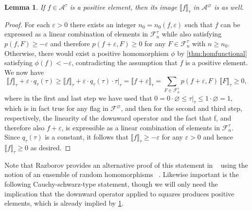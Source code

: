 \documentclass[a4paper,11pt]{article}
\newtheorem{lemma}[theorem]{Lemma}
\numberwithin{equation}{section}
\newcommand{\mA}{\mathcal{A}}
\newcommand{\mF}{\mathcal{F}}
\begin{document}
\begin{lemma}\label{lemma:orderpreserving}
    If $f \in \mA^\tau$ is a positive element, then its image $\llbracket f \rrbracket_{\tau}$ in $\mA^\varnothing$ is as well.
\end{lemma} 
\begin{proof}
    For each $\varepsilon>0$ there exists an integer $n_0 = n_0(f, \varepsilon)$ such that $f$ can be expressed as a linear combination of elements in $\mF^\tau_{n}$ while also satisfying
    $p(f,F)\ge -\varepsilon$ and therefore $p(f+\varepsilon,F)\ge 0$ for  any $F\in \mF^\tau_{n}$ with $n \geq n_0$. 
    Otherwise, there would exist a positive homomorphism $\phi$ by \cref{thm:homfunctional} satisfying $\phi(f)<-\varepsilon$, contradicting the assumption that $f$ is a positive element. We now have
    \[
    \llbracket f\rrbracket_\tau+\varepsilon \cdot q_{\tau}(\tau)
    \ge
    \llbracket f\rrbracket_\tau +\varepsilon \cdot q_{\tau}(\tau) \cdot \tau\vert_\tau 
    =
    \llbracket f+\varepsilon \rrbracket_\tau
    =
    \sum_{F\in\mF^\tau_{n}} p(f+\varepsilon,F) \, \llbracket F\rrbracket_\tau
    \ge 0,
    \]
    where in the first and last step we have used that $0 = 0 \cdot \varnothing \leq \tau\vert_\tau  \leq 1 \cdot \varnothing = 1$, which is in fact true for any flag in $\mF^\varnothing$, and then for the second and third step, respectively, the linearity of the downward operator and the fact that f, and therefore also $f + \varepsilon$, is expressible as a linear combination of elements in $\mF_{n}^\tau$. Since $q_\tau(\tau)$ is a constant, it follows that $\llbracket f\rrbracket_\tau \geq -\varepsilon$ for any $\varepsilon > 0$ and hence $\llbracket f\rrbracket_\tau \geq 0$ as desired.
\end{proof}

Note that Razborov provides an alternative proof of this statement in ~\cite[Theorem 3.1]{Razborov_2007} using the notion of an ensemble of random homomorphisms ~\cite[Definition 10]{Razborov_2007}.
Likewise important is the following Cauchy-schwarz-type statement, though we will only need the implication that the downward operator applied to squares produces positive elements, which is already implied by \cref{lemma:orderpreserving}.
\end{document}
